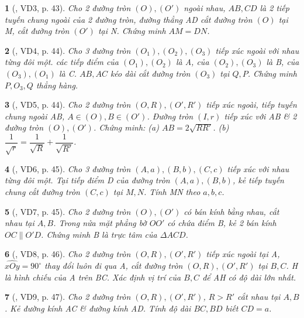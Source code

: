 \documentclass{article}
\newtheorem{baitoan}{}
\begin{document}
\begin{baitoan}[\cite{TLCT_THCS_Toan_9_hinh_hoc}, VD3, p. 43]
	Cho 2 đường tròn $(O),(O')$ ngoài nhau, $AB,CD$ là 2 tiếp tuyến chung ngoài của 2 đường tròn, đường thẳng AD cắt đường tròn $(O)$ tại M, cắt đường tròn $(O')$ tại N. Chứng minh $AM = DN$.
\end{baitoan}

\begin{baitoan}[\cite{TLCT_THCS_Toan_9_hinh_hoc}, VD4, p. 44]
	Cho 3 đường tròn $(O_1),(O_2),(O_3)$ tiếp xúc ngoài với nhau từng đôi một. các tiếp điểm của $(O_1),(O_2)$ là A, của $(O_2),(O_3)$ là B, của $(O_3),(O_1)$ là C. $AB,AC$ kéo dài cắt đường tròn $(O_3)$ tại $Q,P$. Chứng minh $P,O_3,Q$ thẳng hàng.
\end{baitoan}

\begin{baitoan}[\cite{TLCT_THCS_Toan_9_hinh_hoc}, VD5, p. 44]
	Cho 2 đường tròn $(O,R),(O',R')$ tiếp xúc ngoài, tiếp tuyến chung ngoài AB, $A\in(O),B\in(O')$. Đường tròn $(I,r)$ tiếp xúc với AB \& 2 đường tròn $(O),(O')$. Chứng minh: (a) $AB = 2\sqrt{RR'}$. (b) $\dfrac{1}{\sqrt{r}} = \dfrac{1}{\sqrt{R}} + \dfrac{1}{\sqrt{R'}}$.
\end{baitoan}

\begin{baitoan}[\cite{TLCT_THCS_Toan_9_hinh_hoc}, VD6, p. 45]
	Cho 3 đường tròn $(A,a),(B,b),(C,c)$ tiếp xúc với nhau từng đôi một. Tại tiếp điểm D của đường tròn $(A,a),(B,b)$, kẻ tiếp tuyến chung cắt đường tròn $(C,c)$ tại $M,N$. Tính MN theo $a,b,c$.
\end{baitoan}

\begin{baitoan}[\cite{TLCT_THCS_Toan_9_hinh_hoc}, VD7, p. 45]
	Cho 2 đường tròn $(O),(O')$ có bán kính bằng nhau, cắt nhau tại $A,B$. Trong nửa mặt phẳng bờ $OO'$ có chứa điểm B, kẻ 2 bán kính $OC\parallel O'D$. Chứng minh B là trực tâm của $\Delta ACD$.
\end{baitoan}

\begin{baitoan}[\cite{TLCT_THCS_Toan_9_hinh_hoc}, VD8, p. 46]
	Cho 2 đường tròn $(O,R),(O',R')$ tiếp xúc ngoài tại A, $\widehat{xOy} = 90^\circ$  thay đổi luôn đi qua A, cắt đường tròn $(O,R),(O',R')$ tại $B,C$. H là hình chiếu của A trên BC. Xác định vị trí của $B,C$ để AH có độ dài lớn nhất.
\end{baitoan}

\begin{baitoan}[\cite{TLCT_THCS_Toan_9_hinh_hoc}, VD9, p. 47]
	Cho 2 đường tròn $(O,R),(O',R')$, $R > R'$ cắt nhau tại $A,B$. Kẻ đường kính AC \& đường kính AD. Tính độ dài $BC,BD$ biết $CD = a$.
\end{baitoan}
\end{document}
